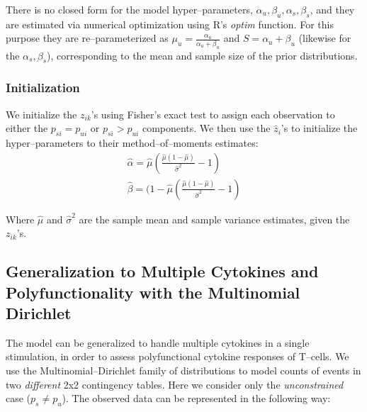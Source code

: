 \documentclass[11pt]{article}
\begin{document}
There is no closed form for the model hyper--parameters, $\alpha_u,\beta_u,\alpha_s,\beta_s$, and they are estimated via numerical optimization using R's \textit{optim} function. For this purpose they are re--parameterized as $\mu_u=\frac{\alpha_u}{\alpha_u+\beta_u}$ and $S=\alpha_u+\beta_u$ (likewise for the $\alpha_s,\beta_s$), corresponding to the mean and sample size of the prior distributions. 

\subsubsection*{Initialization}
We initialize the $z_{ik}$'s using Fisher's exact test to assign each observation to either the $p_{si}=p_{ui}$ or $p_{si} > p_{ui}$ components. We then use the $\hat{z}_i$'s to initialize the hyper--parameters to their method--of--moments estimates:
\begin{align}
\hat{\alpha} = \hat{\mu}\left(\frac{\hat{\mu}(1-\hat{\mu})}{\hat{\sigma}^2} -1\right)\\
\hat{\beta} =  (1-\hat{\mu}\left(\frac{\hat{\mu}(1-\hat{\mu})}{\hat{\sigma}^2} -1\right)
\end{align}

Where $\hat{\mu}$ and $\hat{\sigma}^2$ are the sample mean and sample variance estimates, given the $z_{ik}$'s.

\subsection*{Generalization to Multiple Cytokines and Polyfunctionality with the Multinomial Dirichlet}
The model can be generalized to handle multiple cytokines in a single stimulation, in order to assess polyfunctional cytokine responses of T--cells. We use the Multinomial--Dirichlet family of distributions to model counts of events in two \textit{different} 2x2 contingency tables. Here we consider only the \emph{unconstrained} case ($p_s\ne p_u$). The observed data can be represented in the following way: 
\end{document}
